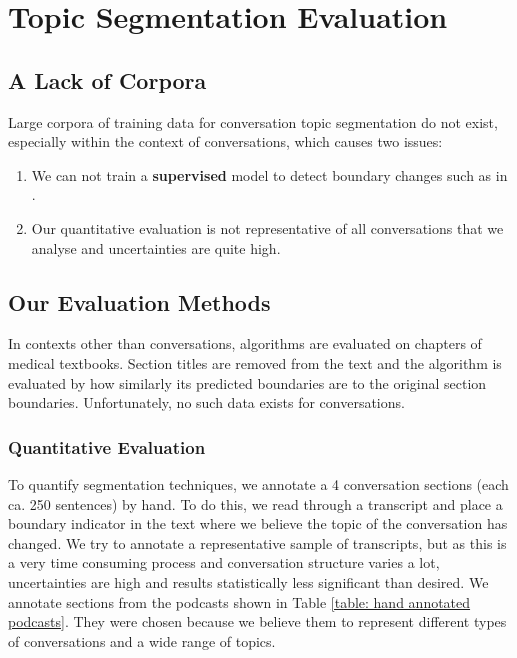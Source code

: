 \section{Topic Segmentation Evaluation}
\subsection{A Lack of Corpora}
    Large corpora of training data for conversation topic segmentation do not exist, especially within the context of conversations, which causes two issues:
    \begin{enumerate}
        \item We can not train a \textbf{supervised} \gls{model} to detect boundary changes such as in \cite{joty2013topic}.
        \item Our quantitative evaluation is not representative of all conversations that we analyse and uncertainties are quite high.
    \end{enumerate}

\subsection{Our Evaluation Methods \label{method: segmentation evaluation}} 
    In contexts other than conversations, algorithms are evaluated on chapters of medical textbooks\cite{eisenstein2008bayesian, simon2013leveraging}. Section titles are removed from the text and the algorithm is evaluated by how similarly its predicted boundaries are to the original section boundaries. Unfortunately, no such data exists for conversations.

    \subsubsection{Quantitative Evaluation} 
        To quantify segmentation techniques, we annotate a 4 conversation sections (each ca. 250 sentences) by hand. To do this, we read through a transcript and place a boundary indicator in the text where we believe the topic of the conversation has changed. We try to annotate a representative sample of transcripts, but as this is a very time consuming process and conversation structure varies a lot, uncertainties are high and results statistically less significant than desired. We annotate sections from the podcasts shown in Table \ref{table: hand annotated podcasts}. They were chosen because we believe them to represent different types of conversations and a wide range of topics.
        

